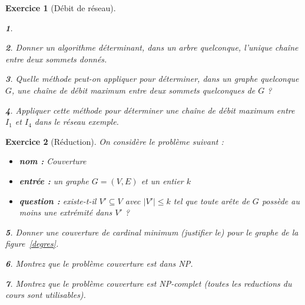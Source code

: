 \documentclass{article}
\theoremstyle{exostyle}
\newtheorem{exo}{Exercice}
\theoremstyle{partiestyle}
\newtheorem{partie}{}[exo]
\theoremstyle{questionstyle}
\begin{document}
\begin{exo}[Débit de réseau]
\begin{partie}
\end{partie}	

\begin{partie}
Donner un algorithme déterminant, dans un arbre
quelconque, l'unique chaîne entre deux sommets donnés.
\end{partie}	

\begin{partie}
Quelle méthode peut-on appliquer pour déterminer, dans
un graphe quelconque $G$, une chaîne de débit maximum entre deux
sommets quelconques de $G$ ?
\end{partie}	

\begin{partie}
	Appliquer cette méthode pour déterminer une chaîne de
	débit maximum entre $I_1$ et $I_4$ dans le réseau exemple.
\end{partie}	

\end{exo}

\begin{exo}[Réduction]
On considère le problème suivant :

\begin{itemize}
	\item {\bf nom :} Couverture
	\item {\bf entrée :} un graphe $G=(V, E)$ et un entier $k$
	\item {\bf question :} existe-t-il $V' \subseteq V$ avec $\vert V' \vert \leq k$ tel que toute arête de $G$ possède au moins une extrémité dans $V'$ ?
\end{itemize}

\begin{partie}
	Donner une couverture de cardinal minimum (justifier le) pour le graphe de la figure~\ref{degres}.
\end{partie}	

\begin{partie}
	Montrez que le problème couverture est dans NP.
\end{partie}
\begin{partie}
		Montrez que le problème couverture est NP-complet (toutes les reductions du cours sont utilisables).
\end{partie}
	
\end{exo}
\end{document}
